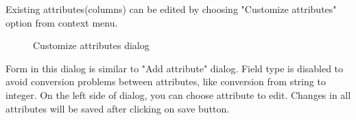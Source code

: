 Existing attributes(columns) can be edited by choosing "Customize attributes" option from context menu.

\begin{figure*}[!ht] 
	\centering
	\caption{Customize attributes dialog}
\end{figure*}

Form in this dialog is similar to "Add attribute" dialog. Field type is disabled to avoid conversion problems between attributes, like conversion from string to integer. On the left side of dialog, you can choose attribute to edit. Changes in all attributes will be saved after clicking on save button.


\vfill\newpage